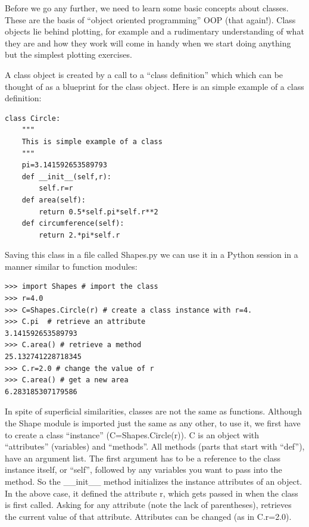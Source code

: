 \documentclass[11pt]{book}
\begin{document}
{Before we go any further, we need to learn some basic concepts about classes. These 
 are the basis of  ``object oriented programming'' OOP (that again!).   Class objects lie behind plotting, for example and a rudimentary understanding of what they are and how they work will come in handy when we start doing anything but the simplest plotting exercises.  
 
  A class object is   created by a call  to a ``class definition''  which which can be thought of as a blueprint for the class object.  Here is an simple example of a class definition:

{ \color{blue} \begin{verbatim}
class Circle:
    """
    This is simple example of a class
    """
    pi=3.141592653589793
    def __init__(self,r):
        self.r=r
    def area(self):
        return 0.5*self.pi*self.r**2
    def circumference(self):
        return 2.*pi*self.r

\end{verbatim}}

\noindent Saving this class in a file called {\color{blue}Shapes.py} we can use it in a Python session in a manner similar to function modules:

{ \color{blue} \begin{verbatim}
>>> import Shapes # import the class
>>> r=4.0
>>> C=Shapes.Circle(r) # create a class instance with r=4.
>>> C.pi  # retrieve an attribute
3.141592653589793
>>> C.area() # retrieve a method
25.132741228718345
>>> C.r=2.0 # change the value of r
>>> C.area() # get a new area
6.283185307179586
\end{verbatim}}

\noindent In spite of superficial similarities, classes are not the same as functions.  Although the Shape module is imported just the same as any other, to use it, we first have to create a class ``instance'' ({\color{blue}C=Shapes.Circle(r)}).  {\color{blue}C} is an object with 	``attributes'' (variables) and ``methods''.  
All methods (parts that start with ``def''),  have an argument list. The first argument has to be a reference to the class instance itself, or ``self'', followed by any variables you want to pass into the method.  So the {\color{blue}\_\_init\_\_} method initializes the instance attributes of an object.  In the above case, it defined the attribute {\color{blue}r}, which gets passed in when the class is first called.  
Asking for any attribute (note the lack of parentheses), retrieves the current value of that attribute.  Attributes can be changed (as in  {\color{blue}C.r=2.0}).   

}
\end{document}
